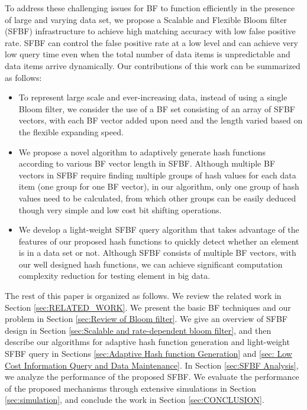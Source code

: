 \documentclass[10pt,journal,compsoc]{IEEEtran}
\begin{document}
To address these challenging issues for BF to function efficiently in the presence of large and varying data set, we propose a Scalable and Flexible Bloom filter (SFBF) infrastructure to achieve high matching accuracy with low false positive rate. SFBF can control the false positive rate at a low level and can achieve very low query time even when the total number of data items is unpredictable and data items arrive dynamically. Our contributions of this work can be summarized as follows:
\begin{itemize}
  \item To represent large scale and ever-increasing data, instead of using a single Bloom filter, we consider the use of a BF set consisting of an array of SFBF vectors, with each BF vector added upon need and the length varied based on the flexible expanding speed.
  \item We propose a novel algorithm to adaptively generate hash functions according to various BF vector length in SFBF. Although multiple BF vectors in SFBF require finding multiple groups of hash values for each data item (one group for one BF vector), in our algorithm, only one group of hash values need to be calculated, from which other groups can be easily deduced though very simple and low cost bit shifting operations.
  \item We develop a light-weight SFBF query algorithm that takes advantage of the features of our proposed hash functions to quickly detect whether an element is in a data set or not. Although SFBF consists of multiple BF vectors, with our well designed hash functions, we can achieve significant computation complexity reduction for testing element in big data.
\end{itemize}


The rest of this paper is organized as follows. We review the related work in Section \ref{sec:RELATED_WORK}. We present the basic BF techniques and  our problem in Section \ref{sec:Review of Bloom filter}. We give an overview of SFBF design in Section \ref{sec:Scalable and rate-dependent bloom filter}, and then describe our algorithms for adaptive hash function generation and light-weight SFBF query in Sections \ref{sec:Adaptive Hash function Generation} and \ref{sec: Low Cost Information Query and Data Maintenance}. In Section \ref{sec:SFBF Analysis}, we analyze the performance of the proposed SFBF. We evaluate the performance of the proposed mechanisms through extensive simulations in Section \ref{sec:simulation}, and conclude the work in Section \ref{sec:CONCLUSION}.
\end{document}
